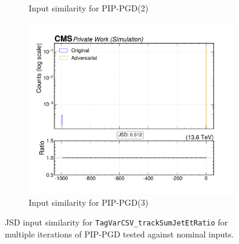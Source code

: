 \begin{figure}[htbp]
\begin{subfigure}[t]{0.32\textwidth}
    \caption*{Input similarity for PIP-PGD(2)}
  \end{subfigure}\hfill
  \begin{subfigure}[t]{0.32\textwidth}
    \includegraphics[width=\linewidth]{media/output/features/compare/combined_it_3/cmp_global_features_TagVarCSV_trackSumJetEtRatio.pdf}
    \caption*{Input similarity for PIP-PGD(3)}
  \end{subfigure}

  \caption*{JSD input similarity for \texttt{TagVarCSV\_trackSumJetEtRatio} for multiple iterations of PIP-PGD tested against nominal inputs.}
  \label{fig:combined_input_TagVarCSV_trackSumJetEtRatio}
\end{figure}

